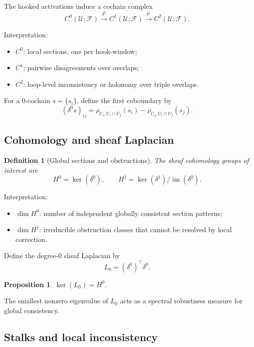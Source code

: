 \documentclass[11pt]{article}
\newtheorem{definition}{Definition}
\newtheorem{proposition}{Proposition}
\begin{document}
The hooked activations induce a cochain complex
\[
C^0(\mathcal{U};\mathcal{F}) \xrightarrow{\delta^0}
C^1(\mathcal{U};\mathcal{F}) \xrightarrow{\delta^1}
C^2(\mathcal{U};\mathcal{F}).
\]

Interpretation:
\begin{itemize}[leftmargin=1.5em]
    \item $C^0$: local sections, one per hook-window;
    \item $C^1$: pairwise disagreements over overlaps;
    \item $C^2$: loop-level inconsistency or holonomy over triple overlaps.
\end{itemize}

For a 0-cochain $s = \{s_i\}$, define the first coboundary by
\[
(\delta^0 s)_{ij} = \rho_{U_i,U_i\cap U_j}(s_i) - \rho_{U_j,U_i\cap U_j}(s_j).
\]

\subsection{Cohomology and sheaf Laplacian}

\begin{definition}[Global sections and obstructions]
The sheaf cohomology groups of interest are
\[
H^0 = \ker(\delta^0), \qquad
H^1 = \ker(\delta^1)/\operatorname{im}(\delta^0).
\]
\end{definition}

Interpretation:
\begin{itemize}[leftmargin=1.5em]
    \item $\dim H^0$: number of independent globally consistent section patterns;
    \item $\dim H^1$: irreducible obstruction classes that cannot be resolved by local correction.
\end{itemize}

Define the degree-0 sheaf Laplacian by
\[
L_0 = (\delta^0)^\top \delta^0.
\]

\begin{proposition}
$\ker(L_0) = H^0$.
\end{proposition}

The smallest nonzero eigenvalue of $L_0$ acts as a spectral robustness measure for global consistency.

\subsection{Stalks and local inconsistency}
\end{document}
